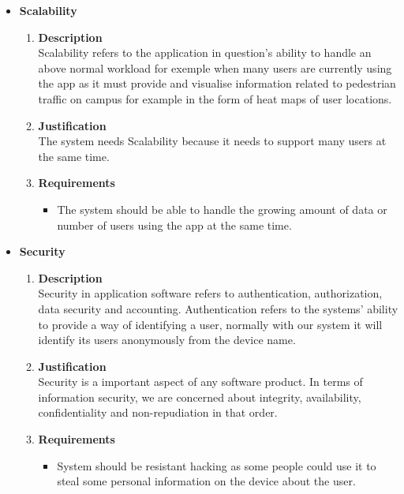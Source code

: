 \documentclass[a4paper,10pt]{article}
\begin{document}
\begin{itemize}
\begin{enumerate}
\end{enumerate}
\item \textbf {Scalability}
\begin{enumerate}
\item \textbf{Description} \\
Scalability refers to the application in question's ability to handle an above normal workload for exemple when many users are currently using the app as it must provide and visualise information related to pedestrian traffic on campus for example in the form of heat maps of user locations.
\item \textbf{Justification} \\
The system needs Scalability because it needs to support many users at the same time.
\item \textbf{Requirements}
	\begin{itemize}
		\item The system should be able to handle the growing amount of data or number of users using the app at the same time.
	\end{itemize}
\end{enumerate}
\item \textbf {Security}
\begin{enumerate}
\item \textbf{Description} \\
Security in application software refers to authentication, authorization, data security and accounting. Authentication refers to the systems' ability to provide a way of identifying a user, normally with our system it will identify its users anonymously from the device name.
\item \textbf{Justification} \\
Security is a important aspect of any software product. In terms of information security, we are concerned about integrity, availability, confidentiality and non-repudiation in that order. 

\item \textbf{Requirements}
	\begin{itemize}
		\item System should be resistant hacking as some people could use it to steal some personal information on the device about the user.
	\end{itemize}
\end{enumerate}


\end{itemize}
\end{document}
